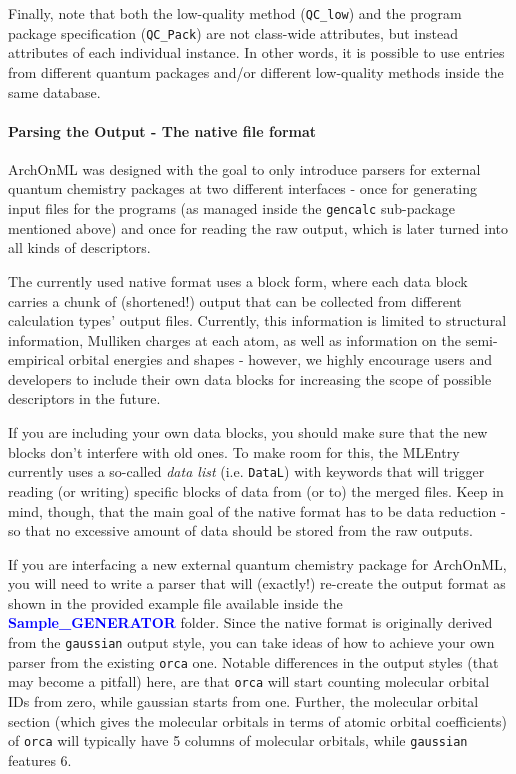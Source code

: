 \documentclass[12pt]{achemso}
\newcommand{\bl}[1]{\textcolor{blue}{\textbf{#1}}}
\begin{document}
\noindent Finally, note that both the low-quality method (\texttt{QC\_low}) and the program package specification (\texttt{QC\_Pack}) are not class-wide attributes, but instead attributes of each individual instance. In other words, it is possible to use entries from different quantum packages and/or different low-quality methods inside the same database.

\paragraph{Parsing the Output - The native file format}

\noindent ArchOnML was designed with the goal to only introduce parsers for external quantum chemistry packages at two different interfaces - once for generating input files for the programs (as managed inside the \texttt{gencalc} sub-package mentioned above) and once for reading the raw output, which is later turned into all kinds of descriptors.

\noindent The currently used native format uses a block form, where each data block carries a chunk of (shortened!) output that can be collected from different calculation types' output files. Currently, this information is limited to structural information, Mulliken charges at each atom, as well as information on the semi-empirical orbital energies and shapes - however, we highly encourage users and developers to include their own data blocks for increasing the scope of possible descriptors in the future.

\noindent If you are including your own data blocks, you should make sure that the new blocks don't interfere with old ones. To make room for this, the MLEntry currently uses a so-called \textit{data list} (i.e. \texttt{DataL}) with keywords that will trigger reading (or writing) specific blocks of data from (or to) the merged files. Keep in mind, though, that the main goal of the native format has to be data reduction - so that no excessive amount of data should be stored from the raw outputs.

\noindent If you are interfacing a new external quantum chemistry package for ArchOnML, you will need to write a parser that will (exactly!) re-create the output format as shown in the provided example file available inside the \bl{Sample\_GENERATOR} folder. Since the native format is originally derived from the \texttt{gaussian} output style, you can take ideas of how to achieve your own parser from the existing \texttt{orca} one. Notable differences in the output styles (that may become a pitfall) here, are that \texttt{orca} will start counting molecular orbital IDs from zero, while gaussian starts from one. Further, the molecular orbital section (which gives the molecular orbitals in terms of atomic orbital coefficients) of \texttt{orca} will typically have 5 columns of molecular orbitals, while \texttt{gaussian} features 6.
\end{document}
